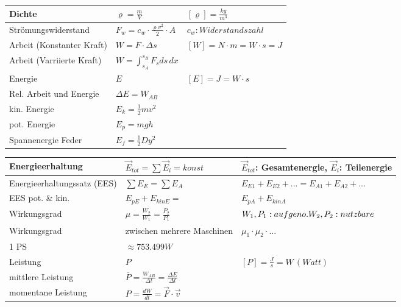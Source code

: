 \begin{tabularx}{\columnwidth}{@{}XXX@{}}
	Dichte & $\varrho = \frac{m}{V}$ & $[\varrho] = \frac{kg}{m^3}$ \\ \hline
	Strömungswiderstand & $ F_w = c_w \cdot \frac{\varrho v^2}{2}\cdot A $ & $c_w: Widerstandszahl$ \\ \hline
	Arbeit (Konstanter Kraft) & $ W = F \cdot \Delta s$ & $[W] = N\cdot m = W\cdot s = J$ \\ \hline
	Arbeit (Varriierte Kraft) & $ W=\int_{s_A}^{s_B} F_sds \,dx  $ \\ \hline
	Energie	& $E$ & $[E] = J = W\cdot s$\\ \hline
	Rel. Arbeit und Energie & $\Delta E = W_{AB}$ \\ \hline
	kin. Energie & $E_k = \frac{1}{2}mv^2$ \\ \hline
	pot. Energie & $E_p = mgh$ \\ \hline
	Spannenergie Feder & $E_f = \frac{1}{2}Dy^2$ \\ \hline
\end{tabularx}
\begin{tabularx}{\columnwidth}{@{}XXX@{}}
	Energieerhaltung            & $ \vec{E}_{tot} = \sum \vec{E}_i = konst $ & $\vec{E}_{tot}$: Gesamtenergie, $\vec{E}_{i}$: Teilenergie \\ \hline
	Energieerhaltungssatz (EES) & $\sum E_E = \sum E_A$                      & $E_{E1} + E_{E2} + ... = E_{A1} + E_{A2} + ...$            \\ \hline
	EES pot. \& kin. & $E_{pE} + E_{kinE} =$ & $E_{pA} + E_{kinA}$ \\ \hline
	Wirkungsgrad & $\mu = \frac{W_2}{W_1} = \frac{P_2}{P_1}$ & $W_1,P_1: aufgeno.\linebreak W_2,P_2: nutzbare$ \\ \hline
	Wirkungsgrad & zwischen mehrere Maschinen & $\mu_1 \cdot \mu_2 \cdot ...$ \\ \hline
	1 PS & $\approx 753.499 W$ \\ \hline
	Leistung & $P$ & $[P] = \frac{J}{s} = W\,(Watt)$ \\ \hline
	mittlere Leistung & $\overline{P} = \frac{W_{AB}}{\Delta t} = \frac{\Delta E}{\Delta t}$ \\ \hline
	momentane Leistung & $P = \frac{dW}{dt} = \vec{F}\cdot\vec{v}$ \\ \hline 
\end{tabularx}
\vspace{1mm}

